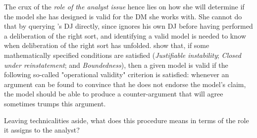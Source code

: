 \documentclass[version=3.21, pagesize, twoside=off, bibliography=totoc, DIV=calc, fontsize=12pt, a4paper, french, english]{scrartcl}
\begin{document}
The crux of the \emph{role of the analyst issue} hence lies on how she will determine if the model she has designed is valid for the \ac{DM} she works with. She cannot do that by querying \thedm’s \ac{DJ} directly, since \thedm{} ignores his own \ac{DJ} before having performed a deliberation of the right sort, and identifying a valid model is needed to know when deliberation of the right sort has unfolded. \citet{cailloux_formal_2019} show that, if some mathematically specified conditions are satisfied (\emph{Justifiable instability}; \emph{Closed under reinstatement}; and \emph{Boundedness}), then  a given model is valid  if the following so-called "operational validity" criterion is satisfied: whenever an argument can be found to convince \thedm{} that he does not endorse the model’s claim, the model should be able to produce a counter-argument that \thedm{} will agree sometimes trumps this argument.

Leaving technicalities aside, what does this procedure means in terms of the role it assigns to the analyst?
\end{document}
